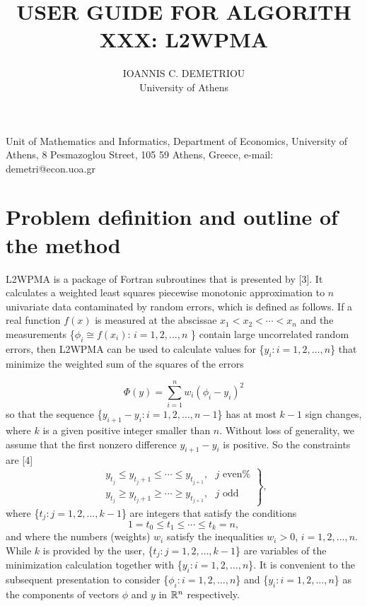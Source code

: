 \documentclass[acmtoms]{acmtrans2m}
\begin{document}
\title{USER GUIDE FOR ALGORITH XXX: L2WPMA}
\author{IOANNIS C. DEMETRIOU \\
University of Athens}
\maketitle

\bigskip 
\begin{bottomstuff}
Unit of Mathematics and Informatics, Department of Economics,
University of Athens, 8 Pesmazoglou Street, 105 59 Athens, Greece,
e-mail: demetri@econ.uoa.gr
\end{bottomstuff}

\section{Problem definition and outline of the method}

L2WPMA is a package of Fortran subroutines that is presented by [3]. It
calculates a weighted least squares piecewise monotonic approximation to $n$
univariate data contaminated by random errors, which is defined as follows.
If a real function $f(x)$ is measured at the abscissae $x_{1}<x_{2}<\cdots
<x_{n}$ and the measurements \{$\phi _{i}\cong f(x_{i})$: $i=1,2,\ldots ,n$%
\} contain large uncorrelated random errors, then L2WPMA can be used to
calculate values for \{$y_{i}:i=1,2,\ldots ,n$\} that minimize the weighted
sum of the squares of the errors

\begin{equation}
\Phi (y)=\sum_{i=1}^{n}w_{i}(\phi _{i}-y_{i})^{2}  \label{1.1}
\end{equation}
so that the sequence \{$y_{i+1}-y_{i}:i=1,2,\ldots ,n-1$\} has at most $k-1$
sign changes, where $k$ is a given positive integer smaller than $n$.
Without loss of generality, we assume that the first nonzero difference $%
y_{i+1}-y_{i}$ is positive. So the constraints are [4] 
\begin{equation}
\left. 
\begin{array}{c}
y_{t_{j}}\leq y_{t_{j}+1}\leq \cdots \leq y_{t_{j+1}},{\text{ }}j{\text{ even%
}} \\ 
y_{t_{j}}\geq y_{t_{j}+1}\geq \cdots \geq y_{t_{j+1}},{\text{ }}j{\text{ odd}%
}
\end{array}
\right\} \text{,}  \label{1.2}
\end{equation}
where \{$t_{j}:j=1,2,...,k-1$\} are integers that satisfy the conditions 
\begin{equation}
1=t_{0}\leq t_{1}\leq \cdots \leq t_{k}=n,  \label{1.3}
\end{equation}
and where the numbers (weights) $w_{i}$ satisfy the inequalities $w_{i}>0$, $%
i=1,2,\ldots ,n$. While $k$ is provided by the user, \{$t_{j}:j=1,2,\ldots
,k-1$\} are variables of the minimization calculation together with \{$%
y_{i}:i=1,2,\ldots ,n$\}. It is convenient to the subsequent presentation to
consider \{$\phi _{i}:i=1,2,\ldots ,n$\} and \{$y_{i}:i=1,2,\ldots ,n$\} as
the components of vectors $\phi $ and $y$ in $\Bbb{R}^{n}$ respectively.
\end{document}
